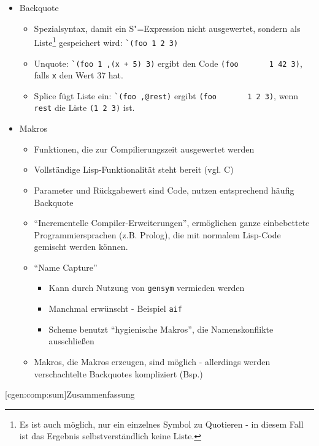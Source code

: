 \documentclass[a4paper, bibgerm]{book}
\newcommand\icode[1]{\lstinline?#1?}
\newcommand\lsubsection{}
\newcommand{\sexp}{S"=Expression}
\begin{document}
\begin{itemize}
\item Backquote
  \begin{itemize}
  \item Spezialsyntax, damit ein \sexp{} nicht ausgewertet, sondern als
    Liste\footnote{Es ist auch möglich, nur ein einzelnes Symbol zu
      Quotieren - in diesem Fall ist das Ergebnis selbstverständlich
      keine Liste.} gespeichert wird: \icode{`(foo 1 2 3)}
  \item Unquote: \icode{`(foo 1 ,(x + 5) 3)} ergibt den Code \icode{(foo
      1 42 3)}, falls \icode{x} den Wert 37 hat.
  \item Splice fügt Liste ein: \icode{`(foo ,@rest)} ergibt \icode{(foo
      1 2 3)}, wenn \icode{rest} die Liste \icode{(1 2 3)} ist.
  \end{itemize}
\item Makros
  \begin{itemize}
  \item Funktionen, die zur Compilierungszeit ausgewertet werden
  \item Vollständige Lisp-Funktionalität steht bereit (vgl. C)
  \item Parameter und Rückgabewert sind Code, nutzen entsprechend häufig Backquote
  \item "`Incrementelle Compiler-Erweiterungen"', ermöglichen ganze
    einbebettete Programmiersprachen (z.B. Prolog), die mit normalem
    Lisp-Code gemischt werden können.
  \item "`Name Capture"'
    \begin{itemize}
    \item Kann durch Nutzung von \icode{gensym} vermieden werden
    \item Manchmal erwünscht - Beispiel \icode{aif}\cite{OnLisp}
    \item Scheme benutzt "`hygienische Makros"', die Namenskonflikte ausschließen
    \end{itemize}
  \item Makros, die Makros erzeugen, sind möglich - allerdings werden
    verschachtelte Backquotes kompliziert (Bsp.)
  \end{itemize}
\end{itemize}

\lsubsection[cgen:comp:sum]{Zusammenfassung}
\end{document}
